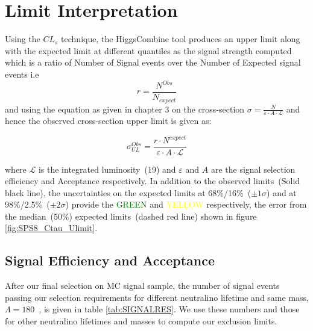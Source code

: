 \chapter{Limit Interpretation}
\label{Limit_Results_and_Intepretation_Chapter}

Using the $CL_{s}$ technique, the HiggsCombine tool produces an upper limit along with the expected limit at different quantiles as the signal strength computed which is a ratio of Number of Signal events over the Number of Expected signal events i.e
\begin{equation}
 r = \frac {N^{Obs}}{N_{expect}}
\end{equation}
and using the equation as given in chapter 3 on the cross-section $\sigma = \frac{N}{\varepsilon\cdot A \cdot \mathscr{L}}$ and hence the observed cross-section upper limit is given as:

\begin{equation}
\sigma^{Obs}_{UL} = \frac{r\cdot N^{expect}}{\varepsilon\cdot A\cdot \mathscr{L}}
\end{equation}

where $\mathscr{L}$ is the integrated luminosity~(19\fbinv) and $\varepsilon$ and $A$ are the signal selection efficiency and Acceptance respectively.
In addition to the observed limits~(Solid black line), the uncertainties on the expected limits at 68\%/16\%~($\pm 1\sigma$) and at 98\%/2.5\%~($\pm 2\sigma$) provide the \textcolor{green}{GREEN} and \textcolor{yellow}{YELLOW} respectively, the error from the median~(50\%) expected limits~(dashed red line) shown in figure \ref{fig:SPS8_Ctau_Ulimit}.


\section{Signal Efficiency and Acceptance}
 After our final selection on MC signal sample, the number of signal events passing our selection requirements for different neutralino lifetime and same mass, $\Lambda=180$~\TeV, is given in table \ref{tab:SIGNALRES}. We use these numbers and those for other neutralino lifetimes and masses to compute our exclusion limits.
